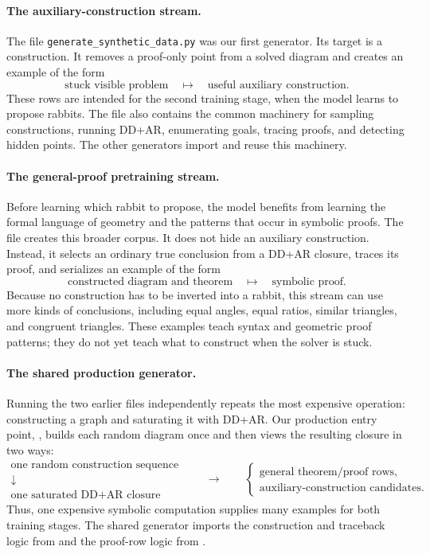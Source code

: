 \documentclass[reqno]{amsart}
\DeclareMathOperator{\1}{\textbf{1}}
\begin{document}
\paragraph{The auxiliary-construction stream.}
The file \verb|generate_synthetic_data.py| was our first generator. Its target
is a construction. It removes a proof-only point from a solved diagram and
creates an example of the form
\[
  \text{stuck visible problem}
  \quad\longmapsto\quad
  \text{useful auxiliary construction}.
\]
These rows are intended for the second training stage, when the model learns to
propose rabbits. The file also contains the common machinery for sampling
constructions, running DD+AR, enumerating goals, tracing proofs, and detecting
hidden points. The other generators import and reuse this machinery.

\paragraph{The general-proof pretraining stream.}
Before learning which rabbit to propose, the model benefits from learning the
formal language of geometry and the patterns that occur in symbolic proofs.
The file  creates this broader corpus. It
does not hide an auxiliary construction. Instead, it selects an ordinary true
conclusion from a DD+AR closure, traces its proof, and serializes an example of
the form
\[
  \text{constructed diagram and theorem}
  \quad\longmapsto\quad
  \text{symbolic proof}.
\]
Because no construction has to be inverted into a rabbit, this stream can use
more kinds of conclusions, including equal angles, equal ratios, similar
triangles, and congruent triangles. These examples teach syntax and geometric
proof patterns; they do not yet teach what to construct when the solver is
stuck.

\paragraph{The shared production generator.}
Running the two earlier files independently repeats the most expensive
operation: constructing a graph and saturating it with DD+AR. Our production
entry point, , builds each random diagram
once and then views the resulting closure in two ways:
\[
\begin{array}{c}
\text{one random construction sequence}\\
\downarrow\\
\text{one saturated DD+AR closure}
\end{array}
\qquad\longrightarrow\qquad
\begin{cases}
\text{general theorem/proof rows},\\
\text{auxiliary-construction candidates}.
\end{cases}
\]
Thus, one expensive symbolic computation supplies many examples for both
training stages. The shared generator imports the construction and traceback
logic from  and the proof-row logic from
.
\end{document}
